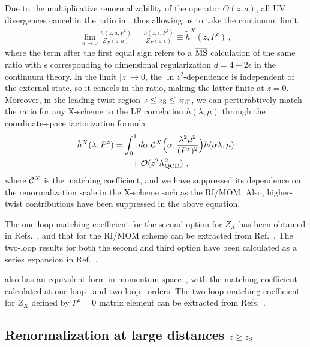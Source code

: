 Due to the multiplicative renormalizability of the operator $O(z,a)$, all UV divergences cancel in the ratio in , thus allowing us to take the continuum limit,
\begin{align}\label{eq:ratio2}
\lim_{a\to0} \frac{{\tilde h}(z,a,P^z)}{Z_X(z,a)} = \frac{{\tilde h}(z,\epsilon,P^z)}{Z_X(z,\epsilon)} \equiv\tilde h^X(z,P^z)\,,
\end{align}
where the term after the first equal sign refers to a ${\overline{\rm MS}}$
calculation of the same ratio with $\epsilon$ corresponding to dimensional regularization $d=4-2\epsilon$ in the continuum theory. In the limit $|z|\to0$, the $\ln z^2$-dependence is independent of the external state, so it cancels in the ratio, making the latter finite at $z=0$.
Moreover, in the leading-twist region $z\le z_{\rm S} \le z_{\rm LT}$, we can perturabtively match the ratio for any X-scheme to the LF correlation $h(\lambda,\mu)$ through the coordinate-space factorization formula~\cite{Izubuchi:2018srq,Radyushkin:2017lvu}
\begin{align}\label{eq:coordfact}
\tilde h^X(\lambda, P^z) & =\int_{0}^1 d\alpha\ {\cal C}^X\Big(\alpha,\frac{\lambda^2\mu^2}{(P^z)^2}\Big) h(\alpha\lambda,\mu) \nonumber\\
&\qquad + {\cal O}(z^2\Lambda_{\rm QCD}^2)\ ,
\end{align}
where ${\cal C}^X$ is the matching coefficient, and we have suppressed its dependence on the renormalization scale in the X-scheme such as the RI/MOM. Also, higher-twist contributions have been suppressed in the above equation.

The one-loop matching coefficient for the second option for $Z_X$ has been obtained in Refs.~\cite{Zhang:2018ggy,Radyushkin:2017lvu,Izubuchi:2018srq}, and that for the RI/MOM scheme can be extracted from Ref.~\cite{Constantinou:2017sej,Izubuchi:2018srq}. The two-loop results for both the second and third option have been calculated as a series expansion in Ref.~\cite{Li:2020xml}.

 also has an equivalent form in momentum space~\cite{Izubuchi:2018srq}, with the matching coefficient calculated at one-loop~\cite{Stewart:2017tvs,Liu:2018uuj,Liu:2018hxv} and two-loop~\cite{Chen:2020ody} orders.
The two-loop matching coefficient for $Z_X$ defined by $P^z=0$ matrix element can be extracted from Refs.~\cite{Chen:2020ody,Li:2020xml}.


\subsection{Renormalization at large distances $z\ge z_{\rm S}$}
\label{sec:long}

